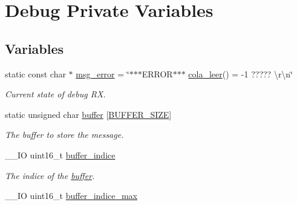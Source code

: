 \hypertarget{group___debug___private___variables}{}\section{Debug Private Variables}
\label{group___debug___private___variables}
\subsection*{Variables}
\begin{DoxyCompactItemize}
\item 
static const char $\ast$ \hyperlink{group___debug___private___variables_ga57ad017acd4535fe089f54ed903b3e9e}{msg\+\_\+error} = \char`\"{}$\ast$$\ast$$\ast$E\+R\+R\+OR$\ast$$\ast$$\ast$ \hyperlink{group___cola___exported___functions___group2_ga12fe948f259d8c9d7a390a76c416b55c}{cola\+\_\+leer}() = -\/1 ????? \textbackslash{}r\textbackslash{}n\char`\"{}
\begin{DoxyCompactList}\small\item\em Current state of debug RX. \end{DoxyCompactList}\item 
static unsigned char \hyperlink{group___debug___private___variables_gacab2203504e72e5e674d3174e0bd7d5e}{buffer} \mbox{[}\hyperlink{group___debug___private___define_ga6b20d41d6252e9871430c242cb1a56e7}{B\+U\+F\+F\+E\+R\+\_\+\+S\+I\+ZE}\mbox{]}\hypertarget{group___debug___private___variables_gacab2203504e72e5e674d3174e0bd7d5e}{}\label{group___debug___private___variables_gacab2203504e72e5e674d3174e0bd7d5e}

\begin{DoxyCompactList}\small\item\em The buffer to store the message. \end{DoxyCompactList}\item 
\+\_\+\+\_\+\+IO uint16\+\_\+t \hyperlink{group___debug___private___variables_gacd3f15a092421e9fa47f50d4f95f212b}{buffer\+\_\+indice}\hypertarget{group___debug___private___variables_gacd3f15a092421e9fa47f50d4f95f212b}{}\label{group___debug___private___variables_gacd3f15a092421e9fa47f50d4f95f212b}

\begin{DoxyCompactList}\small\item\em The indice of the \hyperlink{group___debug___private___variables_gacab2203504e72e5e674d3174e0bd7d5e}{buffer}. \end{DoxyCompactList}\item 
\+\_\+\+\_\+\+IO uint16\+\_\+t \hyperlink{group___debug___private___variables_ga2dc364897dd645d7f940223559bcb511}{buffer\+\_\+indice\+\_\+max}\hypertarget{group___debug___private___variables_ga2dc364897dd645d7f940223559bcb511}{}\label{group___debug___private___variables_ga2dc364897dd645d7f940223559bcb511}


\end{DoxyCompactItemize}
